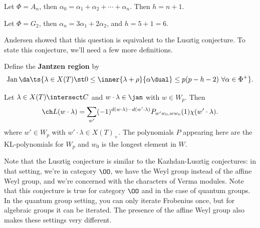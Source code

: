 \begin{example}[?]

Let \(\Phi = A_n\), then
\(\alpha_0 = \alpha_1 + \alpha_2 + \cdots + \alpha_n\). Then \(h=n+1\).

\end{example}

\begin{example}[?]

Let \(\Phi = G_2\), then \(\alpha_n = 3\alpha_1 + 2\alpha_2\), and
\(h = 5+1 = 6\).

\end{example}

\begin{remark}

Andersen showed that this question is equivalent to the Lusztig
conjecture. To state this conjecture, we'll need a few more definitions.

\end{remark}

\begin{definition}

Define the \textbf{Jantzen region} by
\begin{align*}  
\operatorname{Jan} \da \ts{\lambda \in X(T) \st 
0 \leq \inner{\lambda + \rho}{\alpha\dual} \leq p(p-h-2) \,\, \forall \alpha\in \Phi^+
}
.\end{align*}

\end{definition}

\begin{proposition}

Let \(\lambda \in X(T) \intersect C\) and \(w\cdot\lambda \in \jan\)
with \(w\in W_p\). Then
\begin{align*}  
\ch L(w\cdot \lambda) = \sum_{w'} (-1)^{d(w\cdot \lambda) - d(w'\cdot \lambda)} P_{w'w_0, ww_0} (1) \chi(w'\cdot \lambda)
.\end{align*} where \(w'\in W_p\) with \(w'\cdot\lambda \in X(T)_+\).
The polynomials \(P\) appearing here are the KL-polynomials for \(W_p\)
and \(w_0\) is the longest element in \(W\).

\end{proposition}

\begin{remark}

Note that the Lusztig conjecture is similar to the Kazhdan-Lusztig
conjectures: in that setting, we're in category \(\OO\), we have the
Weyl group instead of the affine Weyl group, and we're concerned with
the characters of Verma modules. Note that this conjecture is true for
category \(\OO\) and in the case of quantum groups. In the quantum group
setting, you can only iterate Frobenius once, but for algebraic groups
it can be iterated. The presence of the affine Weyl group also makes
these settings very different.

\end{remark}

